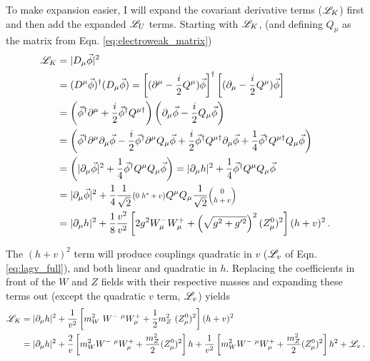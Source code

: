     To make expansion easier, I will expand the covariant derivative terms ($\mathscr{L}_K$) first
        and then add the expanded $\mathscr{L}_U$ terms.
    Starting with $\mathscr{L}_K$, (and defining $Q_{\mu}$ as the matrix from Eqn. \ref{eq:electroweak_matrix})
    \begin{equation} \begin{split}
        \Lag_K &= |D_{\mu} \vec{\phi}|^2
            \\&= (D^{\mu} \vec{\phi})^\dag (D_{\mu} \vec{\phi})
                = \left[(\partial^{\mu} - \frac{i}{2}Q^{\mu}) \vec{\phi}\right]^\dag
                \left[(\partial_{\mu} - \frac{i}{2}Q^{\mu}) \vec{\phi}\right]
            \\&= \left(\vec{\phi}^\dag \partial^{\mu} + \frac{i}{2} \vec{\phi}^\dag Q^{\mu \dag} \right)
                \left(\partial_{\mu}\vec{\phi} - \frac{i}{2}Q_{\mu}\vec{\phi} \right)
            \\&= \left(
                \vec{\phi}^\dag \partial^{\mu} \partial_{\mu}\vec{\phi}
                - \frac{i}{2} \vec{\phi}^\dag \partial^{\mu} Q_{\mu}\vec{\phi}
                + \frac{i}{2} \vec{\phi}^\dag Q^{\mu \dag} \partial_{\mu}\vec{\phi}
                + \frac{1}{4} \vec{\phi}^\dag Q^{\mu \dag} Q_{\mu}\vec{\phi}
                \right)
            \\&= \left(
                | \partial_{\mu}\vec{\phi} |^2
                + \frac{1}{4} \vec{\phi}^\dag Q^{\mu} Q_{\mu} \vec{\phi}
                \right)
                = | \partial_{\mu}h |^2 + \frac{1}{4} \vec{\phi}^\dag Q^{\mu}Q_{\mu} \vec{\phi}
            \\&= | \partial_{\mu}\vec{\phi} |^2 + \frac{1}{4} 
                    \frac{1}{\sqrt{2}}\minimatrix{0 & h^* + v} Q^{\mu}
                    Q_{\mu} \frac{1}{\sqrt{2}}\minimatrix{0 \\ h + v}
            \\&= | \partial_{\mu}h |^2
                + \frac{1}{8} \frac{v^2}{v^2} \left[ 2 g^2  W^-_{\mu} W^+_{\mu}
                + \left(\sqrt{g^2 + g^{\prime 2}}\right)^2 (Z^0_{\mu})^2 \right] (h+v)^2
        \,.
    \end{split} \end{equation}

    The $(h+v)^2$ term will produce couplings quadratic in $v$ ($\mathscr{L}_v$ of Eqn. \ref{eq:lagv_full}), and both linear and quadratic in $h$.
    Replacing the coefficients in front of the $W$ and $Z$ fields with their respective masses
        and expanding these terms out (except the quadratic $v$ term, $\mathscr{L}_v$) yields
    \begin{equation} \begin{split}
        \Lag_K &= | \partial_{\mu}h |^2
                + \frac{1}{v^2} \left[ m_W^2\  W^{-\ \mu} W^+_{\mu}
                    + \frac{1}{2} m_Z^2\ (Z^0_{\mu})^2 \right] (h+v)^2 \\
        &= | \partial_{\mu}h |^2
            + \frac{2}{v}\left[ m_W^2 W^{-\ \mu} W^+_{\mu} + \frac{m_Z^2}{2} (Z^0_{\mu})^2 \right] h
            + \frac{1}{v^2} \left[ m_W^2 W^{-\ \mu} W^+_{\mu} + \frac{m_Z^2}{2} (Z^0_{\mu})^2 \right] h^2
            + \Lag_v %
        \,.
    \end{split} \end{equation}

